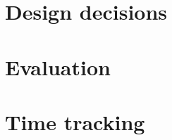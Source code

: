 \documentclass[11pt, oneside]{book}
\begin{document}
\chapter{Design decisions}
\label{chp:design_decisions}


\chapter{Evaluation}
\label{chp:evaluation}


%

\listoftodos[Notes]

\appendix

\chapter{Time tracking}
\label{chp:time_track}


\backmatter

\printbibliography
\end{document}
